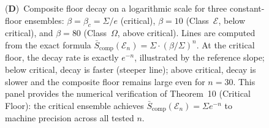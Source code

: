 \begin{figure}[!htbp]
{    (\textbf{D})~Composite floor decay on a logarithmic scale for three constant-floor ensembles: $\beta = \beta_c = \Sigma/e$ (critical), $\beta = 10$ (Class~$\mathcal{E}$, below critical), and $\beta = 80$ (Class~$\Omega$, above critical).  Lines are computed from the exact formula $\bar{S}_{\mathrm{comp}}(\mathcal{E}_n) = \Sigma \cdot (\beta/\Sigma)^n$.  At the critical floor, the decay rate is exactly $e^{-n}$, illustrated by the reference slope; below critical, decay is faster (steeper line); above critical, decay is slower and the composite floor remains large even for $n = 30$.  This panel provides the numerical verification of Theorem~10 (Critical Floor): the critical ensemble achieves $\bar{S}_{\mathrm{comp}}(\mathcal{E}_n) = \Sigma e^{-n}$ to machine precision across all tested $n$.}
    \label{fig:het_panel_4}
\end{figure}

